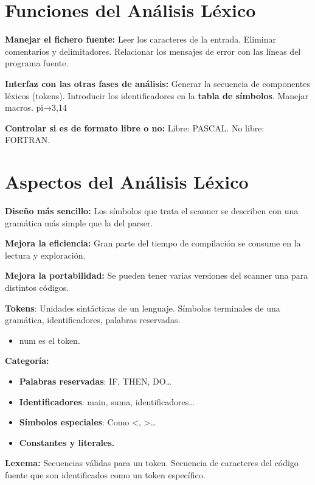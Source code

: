 \documentclass[12pt, twoside, openright]{report} %
\begin{document}
\section{Funciones del Análisis Léxico}

\textbf{Manejar el fichero fuente:} Leer los caracteres de la entrada.
Eliminar comentarios y delimitadores. Relacionar los mensajes de error
con las líneas del programa fuente.

\textbf{Interfaz con las otras fases de análisis:} Generar la secuencia
de componentes léxicos (tokens). Introducir los identificadores en la
\textbf{tabla de símbolos}. Manejar macros. pi→3,14

\textbf{Controlar si es de formato libre o no:} Libre: PASCAL. No libre:
FORTRAN.


\section{Aspectos del Análisis Léxico}

\textbf{Diseño más sencillo:} Los símbolos que trata el scanner se
describen con una gramática más simple que la del parser.

\textbf{Mejora la eficiencia:} Gran parte del tiempo de compilación se
consume en la lectura y exploración.

\textbf{Mejora la portabilidad:} Se pueden tener varias versiones del
scanner una para distintos códigos.

\textbf{Tokens}: Unidades sintácticas de un lenguaje. Símbolos
terminales de una gramática, identificadores, palabras reservadas.

\begin{itemize}

\item
  num es el token.
\end{itemize}

\textbf{Categoría:}

\begin{itemize}
\item
  \textbf{Palabras reservadas}: IF, THEN, DO\ldots{}
\item
  \textbf{Identificadores}: main, suma, identificadores\ldots{}
\item
  \textbf{Símbolos especiales}: Como \textless, \textgreater\ldots{}
\item
  \textbf{Constantes y literales.}
\end{itemize}

\textbf{Lexema:} Secuencias válidas para un token. Secuencia de
caracteres del código fuente que son identificados como un token
específico.
\end{document}

